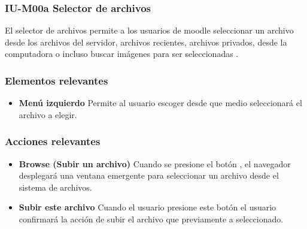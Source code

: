 
\subsubsection{IU-M00a Selector de archivos}

 El selector de archivos permite a los usuarios de moodle seleccionar un archivo desde los archivos
 del servidor, archivos recientes, archivos privados, desde la computadora o incluso buscar imágenes
 para ser seleccionadas \cite{MoodleSelectorArchivos}.


\subsubsection{Elementos relevantes}

    \begin{itemize}
    \item {\bf Menú izquierdo}
        Permite al usuario escoger desde que medio seleccionará el archivo a elegir.
    \end{itemize}

\subsubsection{Acciones relevantes}

    \begin{itemize}
    \item {\bf Browse (Subir un archivo)}
        Cuando se presione el botón , el navegador desplegará una ventana
        emergente para seleccionar un archivo desde el sistema de archivos.

    \item {\bf Subir este archivo}
        Cuando el usuario presione este botón el usuario confirmará la acción de subir
        el archivo que previamente a seleccionado.
    \end{itemize}
